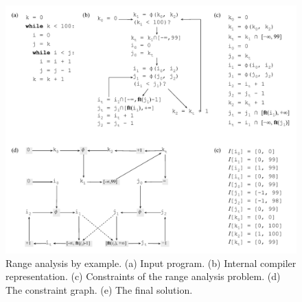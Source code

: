 \documentclass{paper}
\begin{document}
\begin{figure}[H]
\begin{center}
\includegraphics[width=\textwidth]{images/overall_view}
\end{center}
\caption{\label{fig:overall_view}
Range analysis by example.
(a) Input program.
(b) Internal compiler representation.
(c) Constraints of the range analysis problem.
(d) The constraint graph.
(e) The final solution.}
\end{figure}
\end{document}
